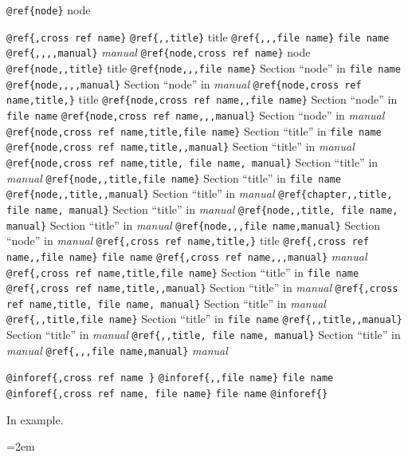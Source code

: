 \documentclass{book}
\begin{document}
%

\texttt{@ref\{node\}} node

\texttt{@ref\{,cross ref name\}} 
\texttt{@ref\{,,title\}} title
\texttt{@ref\{,,,file name\}} \texttt{file name}
\texttt{@ref\{,,,,manual\}} \textit{manual}
\texttt{@ref\{node,cross ref name\}} node
\texttt{@ref\{node,,title\}} title
\texttt{@ref\{node,,,file name\}} Section ``node'' in \texttt{file name}
\texttt{@ref\{node,,,,manual\}} Section ``node'' in \textit{manual}
\texttt{@ref\{node,cross ref name,title,\}} title
\texttt{@ref\{node,cross ref name,,file name\}} Section ``node'' in \texttt{file name}
\texttt{@ref\{node,cross ref name,,,manual\}} Section ``node'' in \textit{manual}
\texttt{@ref\{node,cross ref name,title,file name\}} Section ``title'' in \texttt{file name}
\texttt{@ref\{node,cross ref name,title,,manual\}} Section ``title'' in \textit{manual}
\texttt{@ref\{node,cross ref name,title, file name, manual\}} Section ``title'' in \textit{manual}
\texttt{@ref\{node,,title,file name\}} Section ``title'' in \texttt{file name}
\texttt{@ref\{node,,title,,manual\}} Section ``title'' in \textit{manual}
\texttt{@ref\{chapter,,title, file name, manual\}} Section ``title'' in \textit{manual}
\texttt{@ref\{node,,title, file name, manual\}} Section ``title'' in \textit{manual}
\texttt{@ref\{node,,,file name,manual\}} Section ``node'' in \textit{manual}
\texttt{@ref\{,cross ref name,title,\}} title
\texttt{@ref\{,cross ref name,,file name\}} \texttt{file name}
\texttt{@ref\{,cross ref name,,,manual\}} \textit{manual}
\texttt{@ref\{,cross ref name,title,file name\}} Section ``title'' in \texttt{file name}
\texttt{@ref\{,cross ref name,title,,manual\}} Section ``title'' in \textit{manual}
\texttt{@ref\{,cross ref name,title, file name, manual\}} Section ``title'' in \textit{manual}
\texttt{@ref\{,,title,file name\}} Section ``title'' in \texttt{file name}
\texttt{@ref\{,,title,,manual\}} Section ``title'' in \textit{manual}
\texttt{@ref\{,,title, file name, manual\}} Section ``title'' in \textit{manual}
\texttt{@ref\{,,,file name,manual\}} \textit{manual}

\texttt{@inforef\{,cross ref name \}} 
\texttt{@inforef\{,,file name\}} \texttt{file name}
\texttt{@inforef\{,cross ref name, file name\}} \texttt{file name}
\texttt{@inforef\{\}} 



In example.
\par\begingroup\obeylines\obeyspaces\frenchspacing\leftskip=2em\relax\parskip=0pt\relax\ttfamily{}%
\end{document}
